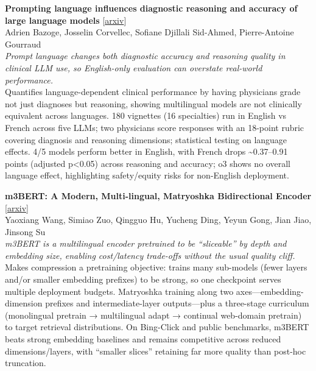 \documentclass[12pt,letterpaper]{article}
\begin{document}
\medskip

{\small\textbf{Prompting language influences diagnostic reasoning and accuracy of large language models}} {\scriptsize[\href{https://arxiv.org/abs/2605.19173}{arxiv}]}\\
{\scriptsize Adrien Bazoge, Josselin Corvellec, Sofiane Djillali Sid-Ahmed, Pierre-Antoine Gourraud}\\

{\small\textit{Prompt language changes both diagnostic accuracy and reasoning quality in clinical LLM use, so English-only evaluation can overstate real-world performance.}}\\[1pt]
{\footnotesize Quantifies language-dependent clinical performance by having physicians grade not just diagnoses but reasoning, showing multilingual models are not clinically equivalent across languages. 180 vignettes (16 specialties) run in English vs French across five LLMs; two physicians score responses with an 18-point rubric covering diagnosis and reasoning dimensions; statistical testing on language effects. 4/5 models perform better in English, with French drops \textasciitilde{}0.37--0.91 points (adjusted p<0.05) across reasoning and accuracy; o3 shows no overall language effect, highlighting safety/equity risks for non-English deployment.}

\medskip

{\small\textbf{m3BERT: A Modern, Multi-lingual, Matryoshka Bidirectional Encoder}} {\scriptsize[\href{https://arxiv.org/abs/2605.19568}{arxiv}]}\\
{\scriptsize Yaoxiang Wang, Simiao Zuo, Qingguo Hu, Yucheng Ding, Yeyun Gong, Jian Jiao, Jinsong Su}\\

{\small\textit{m3BERT is a multilingual encoder pretrained to be ``sliceable'' by depth and embedding size, enabling cost/latency trade-offs without the usual quality cliff.}}\\[1pt]
{\footnotesize Makes compression a pretraining objective: trains many sub-models (fewer layers and/or smaller embedding prefixes) to be strong, so one checkpoint serves multiple deployment budgets. Matryoshka training along two axes---embedding-dimension prefixes and intermediate-layer outputs---plus a three-stage curriculum (monolingual pretrain → multilingual adapt → continual web-domain pretrain) to target retrieval distributions. On Bing-Click and public benchmarks, m3BERT beats strong embedding baselines and remains competitive across reduced dimensions/layers, with ``smaller slices'' retaining far more quality than post-hoc truncation.}
\end{document}
